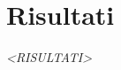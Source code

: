 \chapter{Risultati} \label{Cap.risultati}

\vspace{2cm}

\begin{flushright}
\textit{<RISULTATI>}
\end{flushright}

\vspace{0.5cm}
